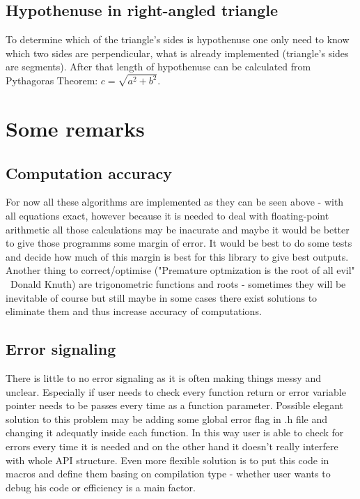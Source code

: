 \documentclass{article}
\begin{document}
\subsection{Hypothenuse in right-angled triangle}
To determine which of the triangle's sides is hypothenuse one only need to know which two sides are perpendicular, what is already implemented (triangle's sides are segments). After that length of hypothenuse can be calculated from Pythagoras Theorem: $ c = \sqrt{a^2+b^2} $.
\section{Some remarks}
\subsection{Computation accuracy}
For now all these algorithms are implemented as they can be seen above - with all equations exact, however because it is needed to deal with floating-point arithmetic all those calculations may be inacurate and maybe it would be better to give those programms some  margin of error. It would be best to do some tests and decide how much of this margin is best for this library to give best outputs. Another thing to correct/optimise ("Premature optmization is the root of all evil" ~Donald Knuth) are trigonometric functions and roots - sometimes they will be inevitable of course but still maybe in some cases there exist solutions to eliminate them and thus increase accuracy of computations.
\subsection{Error signaling}
There is little to no error signaling as it is often making things messy and unclear. Especially if user needs to check every function return or error variable pointer needs to be passes every time as a function parameter.
Possible elegant solution to this problem may be adding some global error flag in .h file and changing it adequatly inside each function. In this way user is able to check for errors every time it is needed and on the other hand it doesn't really interfere with whole API structure. Even more flexible solution is to put this code in macros and define them basing on compilation type - whether user wants to debug his code or efficiency is a main factor. 
\end{document}
